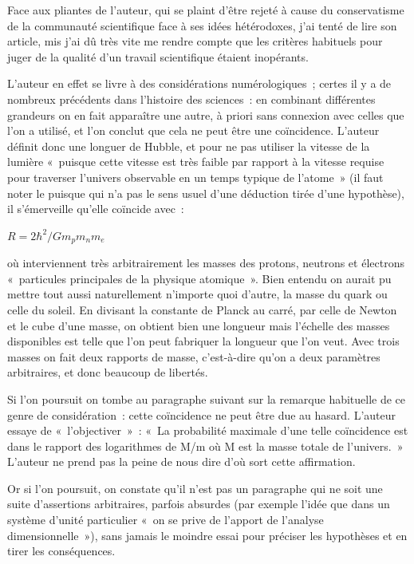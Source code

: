 \documentclass[a4paper,12pt]{article}
\begin{document}
Face aux pliantes de l’auteur, qui se plaint d’être rejeté à cause du conservatisme de la communauté scientifique face à ses idées hétérodoxes, j’ai tenté de lire son article, mis j’ai dû très vite me rendre compte que les critères habituels pour juger de la qualité d’un travail scientifique étaient inopérants.

L’auteur en effet se livre à des considérations numérologiques ; certes il y a de nombreux précédents dans l’histoire des sciences : en combinant différentes grandeurs on en fait apparaître une autre, à priori sans connexion avec celles que l’on a utilisé, et l’on conclut que cela ne peut être une coïncidence. L’auteur définit donc une longuer de Hubble, et pour ne pas utiliser la vitesse de la lumière « puisque cette vitesse est très faible par rapport à la vitesse requise pour traverser l’univers observable en un temps typique de l’atome » (il faut noter le puisque qui n’a pas le sens usuel d’une déduction tirée d’une hypothèse), il s’émerveille qu’elle coïncide avec :

 $R = 2 \hbar^2/Gm_pm_nm_e$

où interviennent très arbitrairement les masses des protons, neutrons et électrons « particules principales de la physique atomique ». Bien entendu on aurait pu mettre tout aussi naturellement n’importe quoi d’autre, la masse du quark ou celle du soleil. En divisant la constante de Planck au carré, par celle de Newton et le cube d’une masse, on obtient bien une longueur mais l’échelle des masses disponibles est telle que l’on peut fabriquer la longueur que l’on veut. Avec trois masses on fait deux rapports de masse, c’est-à-dire qu’on a deux paramètres arbitraires, et donc beaucoup de libertés.

Si l’on poursuit on tombe au paragraphe suivant sur la remarque habituelle de ce genre de considération : cette coïncidence ne peut être due au hasard. L’auteur essaye de « l’objectiver » : « La probabilité maximale d’une telle coïncidence est dans  le rapport des logarithmes de M/m où M est la masse totale de l’univers. » L’auteur ne prend pas la peine de nous dire d’où sort cette affirmation.

Or si l’on poursuit, on constate qu’il n’est pas un paragraphe qui ne soit une suite d’assertions arbitraires, parfois absurdes (par exemple l’idée que dans un système d’unité particulier « on se prive de l’apport de l’analyse dimensionnelle »), sans jamais le moindre essai pour préciser les hypothèses et en tirer les conséquences.
\end{document}
